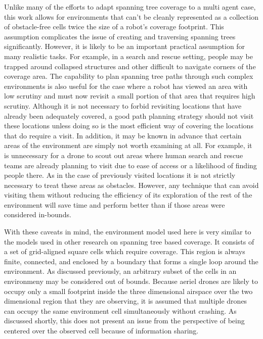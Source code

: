 Unlike many of the efforts to adapt spanning tree coverage to a multi agent case, this work allows for environments that can't be cleanly represented as a collection of obstacle-free cells twice the size of a robot's coverage footprint. This assumption complicates the issue of creating and traversing spanning trees significantly. However, it is likely to be an important practical assumption for many realistic tasks. For example, in a search and rescue setting, people may be trapped around collapsed structures and other difficult to navigate corners of the coverage area. The capability to plan spanning tree paths through such complex environments is also useful for the case where a robot has viewed an area with low scrutiny and must now revisit a small portion of that area that requires high scrutiny. Although it is not necessary to forbid revisiting locations that have already been adequately covered, a good path planning strategy should not visit these locations unless doing so is the most efficient way of covering the locations that do require a visit. In addition, it may be known in advance that certain areas of the environment are simply not worth examining at all. For example, it is unnecessary for a drone to scout out areas where human search and rescue teams are already planning to visit due to ease of access or a likelihood of finding people there. As in the case of previously visited locations it is not strictly necessary to treat these areas as obstacles. However, any technique that can avoid visiting them without reducing the efficiency of its exploration of the rest of the environment will save time and perform better than if those areas were considered in-bounds.

With these caveats in mind, the environment model used here is very similar to the models used in other research on spanning tree based coverage. It consists of a set of grid-aligned square cells which require coverage. This region is always finite, connected, and enclosed by a boundary that forms a single loop around the environment. As discussed previously, an arbitrary subset of the cells in an environmeny may be considered out of bounds. Because aeriel drones are likely to occupy only a small footprint inside the three dimensional airspace over the two dimensional region that they are observing, it is assumed that multiple drones can occupy the same environment cell simultaneously without crashing. As discussed shortly, this does not present an issue from the perspective of being centered over the observed cell because of information sharing.


